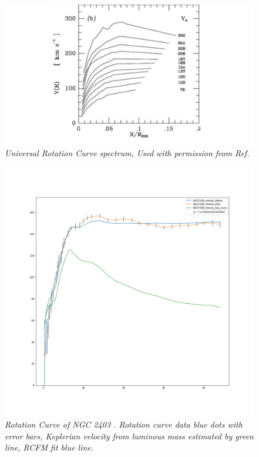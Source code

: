 \documentclass[reprint,%
 amsmath,amssymb,
 aps,
]{revtex4-1}
\begin{document}
  
 \begin{figure}[h!]
     \centering
     \includegraphics[width=\linewidth]{URC}
     \caption{\emph{Universal Rotation Curve spectrum, Used with permission from Ref.\citep{salucci}}}
     \label{fig:URC}
\end{figure}
  

  
    
 \begin{figure}[h!]
      \centering
      \includegraphics[width=\linewidth]{figures/NGC3198_rotmod_XueSofue.png}
      \caption{\emph{Rotation Curve of NGC 2403 \cite{Blok1}.   Rotation curve data blue dots with  error bars,  Keplerian velocity from luminous mass estimated by   green line,   RCFM fit blue line.} }
      \label{fig:NGC2403}
  \end{figure}
\end{document}
